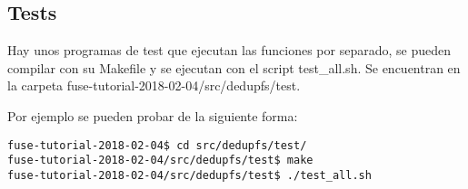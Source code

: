 \documentclass[a4paper,12pt]{article}
\begin{document}
\subsection{Tests}


Hay unos programas de test que ejecutan las funciones por separado, se pueden compilar con su Makefile y se ejecutan con el script test\_all.sh. Se encuentran en la carpeta fuse-tutorial-2018-02-04/src/dedupfs/test.
\bigskip

Por ejemplo se pueden probar de la siguiente forma:
\begin{verbatim}
fuse-tutorial-2018-02-04$ cd src/dedupfs/test/
fuse-tutorial-2018-02-04/src/dedupfs/test$ make
fuse-tutorial-2018-02-04/src/dedupfs/test$ ./test_all.sh
\end{verbatim}
\end{document}
